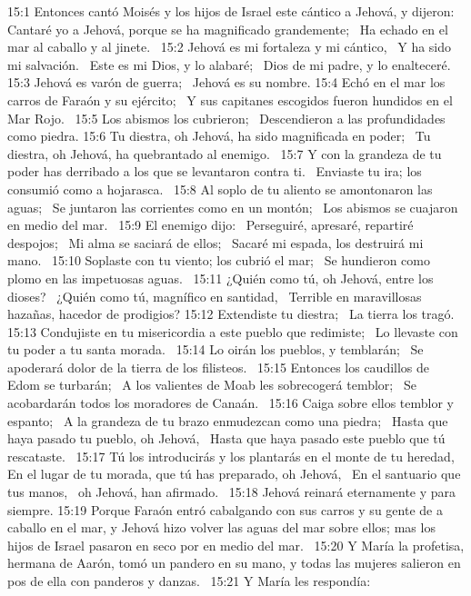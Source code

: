 15:1 Entonces cantó Moisés y los hijos de Israel este cántico a Jehová, y dijeron:  
Cantaré yo a Jehová, porque se ha magnificado grandemente;  
Ha echado en el mar al caballo y al jinete.  
15:2 Jehová es mi fortaleza y mi cántico,  
Y ha sido mi salvación.  
Este es mi Dios, y lo alabaré;  
Dios de mi padre, y lo enalteceré. 
15:3 Jehová es varón de guerra;  
Jehová es su nombre. 
15:4 Echó en el mar los carros de Faraón y su ejército;  
Y sus capitanes escogidos fueron hundidos en el Mar Rojo.  
15:5 Los abismos los cubrieron;  
Descendieron a las profundidades como piedra. 
15:6 Tu diestra, oh Jehová, ha sido magnificada en poder;  
Tu diestra, oh Jehová, ha quebrantado al enemigo.  
15:7 Y con la grandeza de tu poder has derribado a los que se levantaron contra ti.  
Enviaste tu ira; los consumió como a hojarasca.  
15:8 Al soplo de tu aliento se amontonaron las aguas;  
Se juntaron las corrientes como en un montón;  
Los abismos se cuajaron en medio del mar.  
15:9 El enemigo dijo:  
Perseguiré, apresaré, repartiré despojos;  
Mi alma se saciará de ellos;  
Sacaré mi espada, los destruirá mi mano.  
15:10 Soplaste con tu viento; los cubrió el mar;  
Se hundieron como plomo en las impetuosas aguas.  
15:11 ¿Quién como tú, oh Jehová, entre los dioses?  
¿Quién como tú, magnífico en santidad,  
Terrible en maravillosas hazañas, hacedor de prodigios? 
15:12 Extendiste tu diestra;  
La tierra los tragó. 
15:13 Condujiste en tu misericordia a este pueblo que redimiste;  
Lo llevaste con tu poder a tu santa morada.  
15:14 Lo oirán los pueblos, y temblarán;  
Se apoderará dolor de la tierra de los filisteos.  
15:15 Entonces los caudillos de Edom se turbarán;  
A los valientes de Moab les sobrecogerá temblor;  
Se acobardarán todos los moradores de Canaán.  
15:16 Caiga sobre ellos temblor y espanto;  
A la grandeza de tu brazo enmudezcan como una piedra;  
Hasta que haya pasado tu pueblo, oh Jehová,  
Hasta que haya pasado este pueblo que tú rescataste.  
15:17 Tú los introducirás y los plantarás en el monte de tu heredad,  
En el lugar de tu morada, que tú has preparado, oh Jehová,  
En el santuario que tus manos,  
oh Jehová, han afirmado.  
15:18 Jehová reinará eternamente y para siempre. 
15:19 Porque Faraón entró cabalgando con sus carros y su gente de a caballo en el mar, y Jehová hizo volver las aguas del mar sobre ellos; mas los hijos de Israel pasaron en seco por en medio del mar.  
15:20 Y María la profetisa, hermana de Aarón, tomó un pandero en su mano, y todas las mujeres salieron en pos de ella con panderos y danzas.  
15:21 Y María les respondía:  

